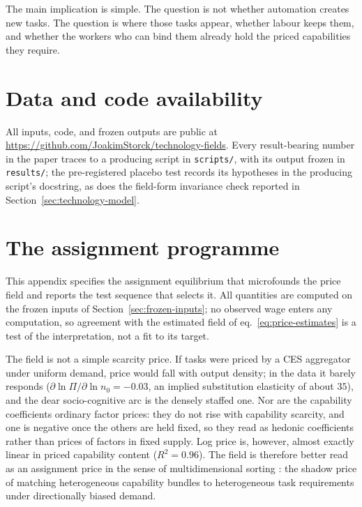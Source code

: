 \documentclass[12pt, a4paper]{article}
\begin{document}
The main implication is simple. The question is not whether automation
creates new tasks. The question is where those tasks appear, whether
labour keeps them, and whether the workers who can bind them already
hold the priced capabilities they require.

\section*{Data and code availability}

All inputs, code, and frozen outputs are public at
\url{https://github.com/JoakimStorck/technology-fields}. Every
result-bearing number in the paper traces to a producing script in
\texttt{scripts/}, with its output frozen in \texttt{results/}; the
pre-registered placebo test records its hypotheses in the producing
script's docstring, as does the field-form invariance check reported in
Section~\ref{sec:technology-model}.

\printbibliography

\appendix

\section{The assignment programme}
\label{app:assignment}

This appendix specifies the assignment equilibrium that microfounds
the price field and reports the test sequence that selects it. All quantities are computed on the frozen
inputs of Section~\ref{sec:frozen-inputs}; no observed wage enters any
computation, so agreement with the estimated field of
eq.~\eqref{eq:price-estimates} is a test of the interpretation, not a
fit to its target.

The field is not a simple scarcity price. If tasks were priced by a CES
aggregator under uniform demand, price would fall with output density;
in the data it barely responds
($\partial\ln\Pi/\partial\ln n_0 = -0.03$, an implied substitution
elasticity of about $35$), and the dear socio-cognitive arc is the
densely staffed one. Nor are the capability coefficients ordinary
factor prices: they do not rise with capability scarcity, and one is
negative once the others are held fixed, so they read as hedonic
coefficients rather than prices of factors in fixed supply. Log price
is, however, almost exactly linear in priced capability content
($R^2 = 0.96$). The field is therefore better read as an assignment
price in the sense of multidimensional sorting \parencite{lindenlaub2017}:
the shadow price of matching heterogeneous capability bundles
to heterogeneous task requirements under directionally biased demand.
\end{document}
